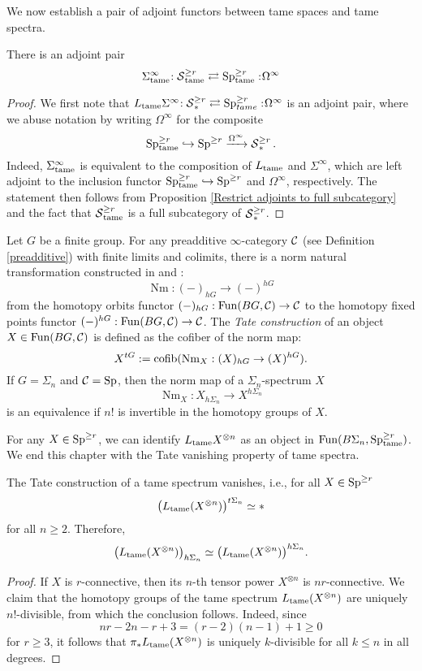 We now establish a pair of adjoint functors between tame spaces and tame spectra.

\begin{proposition}
	There is an adjoint pair
	\[
	\Sigma^{\infty}_{\operatorname{\operatorname{tame}}}\negmedspace: \operatorname{\mathcal{S}}^{\geq r}_{\operatorname{\operatorname{tame}}}\rightleftarrows \operatorname{Sp}^{\geq r}_{\operatorname{\operatorname{tame}}}:\negmedspace \Omega^{\infty}
	\]
\end{proposition}
\begin{proof}
	We first note that $L_{\operatorname{\operatorname{tame}}}\Sigma^{\infty}\negmedspace: \operatorname{\mathcal{S}}_{*}^{\geq r}\rightleftarrows \operatorname{Sp}^{\geq r}_{tame}:\negmedspace \Omega^\infty$ is an adjoint pair, where we abuse notation by writing $\Omega^{\infty}$ for the composite  $$
	\operatorname{Sp}^{\geq r}_{\operatorname{\operatorname{tame}}}\hookrightarrow \operatorname{Sp}^{\geq r} \xrightarrow{\Omega^\infty} \operatorname{\mathcal{S}}^{\geq r}_{*}.
	$$ 
	Indeed, $\Sigma^{\infty}_{\operatorname{\operatorname{tame}}}$ is equivalent to the composition of $L_{\operatorname{\operatorname{tame}}}$ and $\Sigma^\infty$, which are left adjoint to the inclusion functor $\operatorname{Sp}^{\geq r}_{\operatorname{\operatorname{tame}}}\hookrightarrow \operatorname{Sp}^{\geq r}$ and $\Omega^\infty$, respectively. The statement then follows from Proposition \ref{Restrict adjoints to full subcategory} and the fact that $\operatorname{\mathcal{S}}_{\operatorname{\operatorname{tame}}}^{\geq r}$ is a full subcategory of $\operatorname{\mathcal{S}}_{*}^{\geq r}$. 
	
\end{proof}

Let $G$ be a finite group.
For any preadditive $\infty$-category ${\mathcal{C}}$ (see Definition \ref{preadditive}) with finite limits and colimits, there is a norm natural transformation constructed in \cite[\S 6.1.6]{HA} and \cite[Definition I.1.10]{Nikolaus-Scholze}:
$$
\operatorname{Nm}: (-)_{hG} \to (-)^{hG}
$$
from the homotopy orbits functor $(-)_{hG}:\operatorname{Fun}(BG,{\mathcal{C}})\to {\mathcal{C}}$ to the homotopy fixed points functor $(-)^{hG}:\operatorname{Fun}(BG,{\mathcal{C}})\to {\mathcal{C}}$.
The \emph{Tate construction} of an object $X\in \operatorname{Fun}(BG,{\mathcal{C}})$ is defined as the cofiber of the norm map:
$$
X^{tG} := \operatorname{cofib}(\operatorname{Nm}_X:(X)_{hG} \to (X)^{hG}).
$$
If $G=\Sigma_n$ and ${\mathcal{C}}=\operatorname{Sp}$, then the norm map of a $\Sigma_n$-spectrum $X$
$$
\operatorname{Nm}_X: X_{h\Sigma_n} \to X^{h\Sigma_n}
$$
is an equivalence if $n!$ is invertible in the homotopy groups of $X$.

For any $X\in \operatorname{Sp}^{\geq r}$, we can identify $L_{\operatorname{\operatorname{tame}}}X^{\otimes n}$ as an object in $\operatorname{Fun}(B\Sigma_n, \operatorname{Sp}^{\geq r}_{\operatorname{\operatorname{tame}}})$.
We end this chapter with the Tate vanishing property of tame spectra.
\begin{lemma}
\label{Tate vanishing for tame spectra}
    The Tate construction of a tame spectrum vanishes, i.e., for all $X\in \operatorname{Sp}^{\geq r}$
	$$
	\big(L_{\operatorname{\operatorname{tame}}}(X^{\otimes n})\big)^{t\Sigma_n}\simeq *
	$$
	for all $n\geq 2$. Therefore, 
	$$
	\big(L_{\operatorname{\operatorname{tame}}}(X^{\otimes n})\big)_{h\Sigma_n}
	\simeq
	\big(L_{\operatorname{\operatorname{tame}}}(X^{\otimes n})\big)^{h\Sigma_n}.
	$$
\end{lemma}
\begin{proof}
    If $X$ is $r$-connective, then its $n$-th tensor power $X^{\otimes n}$ is $nr$-connective. We claim that the homotopy groups of the tame spectrum $L_{\operatorname{\operatorname{tame}}}(X^{\otimes n})$ are uniquely $n!$-divisible, from which the conclusion follows. Indeed, since   
    $$
    nr-2n-r+3 = (r-2)(n-1)+1\geq 0
    $$
    for $r\geq 3$, it follows that $\pi_{*}L_{\operatorname{\operatorname{tame}}}(X^{\otimes n})$ is uniquely $k$-divisible for all $k\leq n$ in all degrees.
\end{proof}